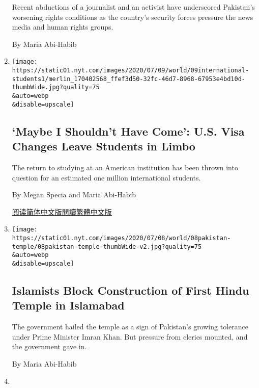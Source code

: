 \begin{enumerate}
  Recent abductions of a journalist and an activist have underscored
  Pakistan's worsening rights conditions as the country's security
  forces pressure the news media and human rights groups.

  By Maria Abi-Habib
\item
  \href{/2020/07/09/world/international-students-visa-reaction.html}{}

  \texttt{[image: https://static01.nyt.com/images/2020/07/09/world/09international-students1/merlin\_170402568\_ffef3d50-32fc-46d7-8968-67953e4bd10d-thumbWide.jpg?quality=75\\\&auto=webp\\\&disable=upscale]}

  \hypertarget{maybe-i-shouldnt-have-come-us-visa-changes-leave-students-in-limbo}{%
  \subsection{`Maybe I Shouldn't Have Come': U.S. Visa Changes Leave
  Students in
  Limbo}\label{maybe-i-shouldnt-have-come-us-visa-changes-leave-students-in-limbo}}

  The return to studying at an American institution has been thrown into
  question for an estimated one million international students.

  By Megan Specia and Maria Abi-Habib

  \href{https://cn.nytimes.com/usa/20200710/international-students-visa-reaction/}{阅读简体中文版}\href{https://cn.nytimes.com/usa/20200710/international-students-visa-reaction/zh-hant/}{閱讀繁體中文版}
\item
  \href{/2020/07/08/world/asia/hindu-temple-islamabad-islamists-pakistan.html}{}

  \texttt{[image: https://static01.nyt.com/images/2020/07/08/world/08pakistan-temple/08pakistan-temple-thumbWide-v2.jpg?quality=75\\\&auto=webp\\\&disable=upscale]}

  \hypertarget{islamists-block-construction-of-first-hindu-temple-in-islamabad}{%
  \subsection{Islamists Block Construction of First Hindu Temple in
  Islamabad}\label{islamists-block-construction-of-first-hindu-temple-in-islamabad}}

  The government hailed the temple as a sign of Pakistan's growing
  tolerance under Prime Minister Imran Khan. But pressure from clerics
  mounted, and the government gave in.

  By Maria Abi-Habib
\item
  \href{/2020/06/29/world/asia/tik-tok-banned-india-china.html}{}


\end{enumerate}
